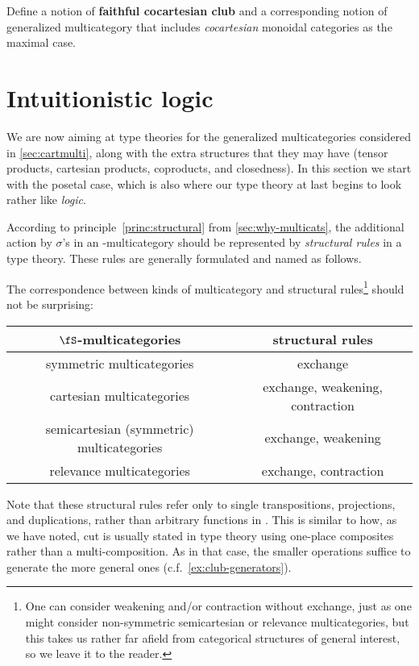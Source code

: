 \documentclass{book}
\let\types\vdash
\begin{document}
\begin{ex}\label{ex:cocartesian-clubs}
  Define a notion of \textbf{faithful cocartesian club} and a corresponding notion of generalized multicategory that includes \emph{cocartesian} monoidal categories as the maximal case.
\end{ex}


\section{Intuitionistic logic}
\label{sec:logic}

We are now aiming at type theories for the generalized multicategories considered in \cref{sec:cartmulti}, along with the extra structures that they may have (tensor products, cartesian products, coproducts, and closedness).
In this section we start with the posetal case, which is also where our type theory at last begins to look rather like \emph{logic}.

According to principle~\eqref{princ:structural} from \cref{sec:why-multicats}, the additional action by $\sigma$'s in an \fS-multicategory should be represented by \emph{structural rules} in a type theory.
These rules are generally formulated and named as follows.
The correspondence between kinds of multicategory and structural rules\footnote{One can consider weakening and/or contraction without exchange, just as one might consider non-symmetric semicartesian or relevance multicategories, but this takes us rather far afield from categorical structures of general interest, so we leave it to the reader.} should not be surprising:
\begin{center}
\begin{tabular}{c|c}
  $\fS$-multicategories & structural rules\\\hline
  {symmetric multicategories} & exchange\\
  {cartesian multicategories} & exchange, weakening, contraction\\
  {semicartesian (symmetric) multicategories} & exchange, weakening\\
  {relevance multicategories} & exchange, contraction
\end{tabular}
\end{center}
Note that these structural rules refer only to single transpositions, projections, and duplications, rather than arbitrary functions in \fS.
This is similar to how, as we have noted, cut is usually stated in type theory using one-place composites rather than a multi-composition.
As in that case, the smaller operations suffice to generate the more general ones (c.f.\ \cref{ex:club-generators}).
\end{document}
